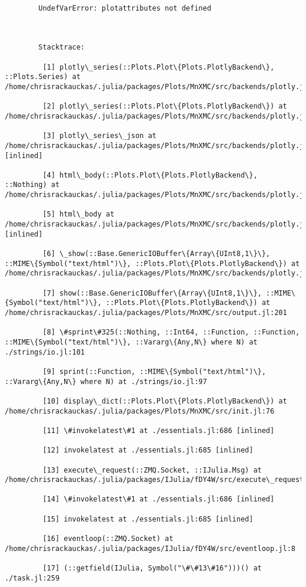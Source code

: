 \documentclass[11pt]{article}
\begin{document}
    \begin{Verbatim}[commandchars=\\\{\}]

        UndefVarError: plotattributes not defined

        

        Stacktrace:

         [1] plotly\_series(::Plots.Plot\{Plots.PlotlyBackend\}, ::Plots.Series) at /home/chrisrackauckas/.julia/packages/Plots/MnXMC/src/backends/plotly.jl:576

         [2] plotly\_series(::Plots.Plot\{Plots.PlotlyBackend\}) at /home/chrisrackauckas/.julia/packages/Plots/MnXMC/src/backends/plotly.jl:875

         [3] plotly\_series\_json at /home/chrisrackauckas/.julia/packages/Plots/MnXMC/src/backends/plotly.jl:881 [inlined]

         [4] html\_body(::Plots.Plot\{Plots.PlotlyBackend\}, ::Nothing) at /home/chrisrackauckas/.julia/packages/Plots/MnXMC/src/backends/plotly.jl:899

         [5] html\_body at /home/chrisrackauckas/.julia/packages/Plots/MnXMC/src/backends/plotly.jl:894 [inlined]

         [6] \_show(::Base.GenericIOBuffer\{Array\{UInt8,1\}\}, ::MIME\{Symbol("text/html")\}, ::Plots.Plot\{Plots.PlotlyBackend\}) at /home/chrisrackauckas/.julia/packages/Plots/MnXMC/src/backends/plotly.jl:921

         [7] show(::Base.GenericIOBuffer\{Array\{UInt8,1\}\}, ::MIME\{Symbol("text/html")\}, ::Plots.Plot\{Plots.PlotlyBackend\}) at /home/chrisrackauckas/.julia/packages/Plots/MnXMC/src/output.jl:201

         [8] \#sprint\#325(::Nothing, ::Int64, ::Function, ::Function, ::MIME\{Symbol("text/html")\}, ::Vararg\{Any,N\} where N) at ./strings/io.jl:101

         [9] sprint(::Function, ::MIME\{Symbol("text/html")\}, ::Vararg\{Any,N\} where N) at ./strings/io.jl:97

         [10] display\_dict(::Plots.Plot\{Plots.PlotlyBackend\}) at /home/chrisrackauckas/.julia/packages/Plots/MnXMC/src/init.jl:76

         [11] \#invokelatest\#1 at ./essentials.jl:686 [inlined]

         [12] invokelatest at ./essentials.jl:685 [inlined]

         [13] execute\_request(::ZMQ.Socket, ::IJulia.Msg) at /home/chrisrackauckas/.julia/packages/IJulia/fDY4W/src/execute\_request.jl:221

         [14] \#invokelatest\#1 at ./essentials.jl:686 [inlined]

         [15] invokelatest at ./essentials.jl:685 [inlined]

         [16] eventloop(::ZMQ.Socket) at /home/chrisrackauckas/.julia/packages/IJulia/fDY4W/src/eventloop.jl:8

         [17] (::getfield(IJulia, Symbol("\#\#13\#16")))() at ./task.jl:259

    \end{Verbatim}
\end{document}
